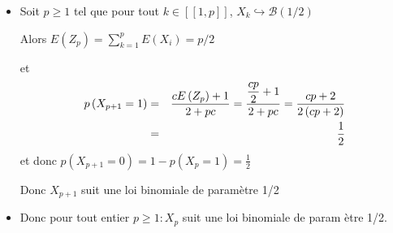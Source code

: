 \begin{correction}
\begin{enumerate}
\begin{enumerate}
\begin{itemize}
\item Soit $p\ge 1$ tel que pour tout $k\in \left[ \left[ 1,p\right] \right] 
$, $X_{k}\hookrightarrow \mathcal{B}\left( 1/2\right) $

Alors $E\left( Z_{p}\right) =\sum_{k=1}^{p}E\left( X_{i}\right) =p/2$

et 
\begin{eqnarray*}
p\left( X_{p+1}=1\right) &=&\frac{cE\left( Z_{p}\right) +1}{2+pc}=\frac{%
\displaystyle \frac{cp}{2}+1}{2+pc}=\frac{cp+2}{2\left( cp+2\right) } \\
&=&\frac{1}{2}
\end{eqnarray*}
et donc $p\left( X_{p+1}=0\right) =1-p\left( X_{p}=1\right) =\frac{1}{2}$

Donc $X_{p+1}$ suit une loi binomiale de param\`{e}tre 1/2

\item Donc pour tout entier $p\geq 1:X_{p}$ suit une loi binomiale de param%
\`{e}tre 1/2.
\end{itemize}
\end{enumerate}
\end{enumerate}
\end{correction}